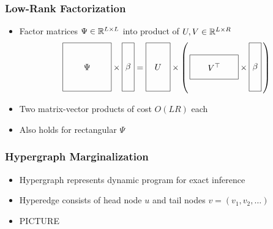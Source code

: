 \documentclass{beamer}
\begin{document}
\begin{frame}
\frametitle{Low-Rank Factorization}
\begin{itemize}
\item Factor matrices $\Psi\in\mathbb{R}^{L\times L}$ into product of $U,V\in\mathbb{R}^{L \times R}$
\[
\vcenter{\hbox{\begin{tikzpicture}[baseline=-0.5ex]
    \draw (0,0) rectangle (2,2) node[pos=.5] {$\Psi$};
\end{tikzpicture}}}
\times
\vcenter{\hbox{\begin{tikzpicture}[baseline=-0.5ex]
    \draw (0,0) rectangle (.5,2) node[pos=.5] {$\beta$};
\end{tikzpicture}}}
=
\vcenter{\hbox{\begin{tikzpicture}[baseline=-0.5ex]
    \draw (0,0) rectangle (1,2) node[pos=.5] {$U$};
\end{tikzpicture}}}
\times
\left(\,
\vcenter{\hbox{\begin{tikzpicture}[baseline=-0.5ex]
    \draw (0,0) rectangle (2,1) node[pos=.5] {$V^\top$};
\end{tikzpicture}}}
\times
\vcenter{\hbox{\begin{tikzpicture}[baseline=-0.5ex]
    \draw (0,0) rectangle (.5,2) node[pos=.5] {$\beta$};
\end{tikzpicture}}}
\,\right)
\]
\item Two matrix-vector products of cost $O(LR)$ each
\vspace{1em}
\item Also holds for rectangular $\Psi$
\end{itemize}
\end{frame}

\begin{frame}
\frametitle{Hypergraph Marginalization}
\begin{itemize}
\item Hypergraph represents dynamic program for exact inference
\item Hyperedge consists of head node $u$ and tail nodes $v = (v_1,v_2,\ldots)$
\item PICTURE
\end{itemize}
\end{frame}
\end{document}
